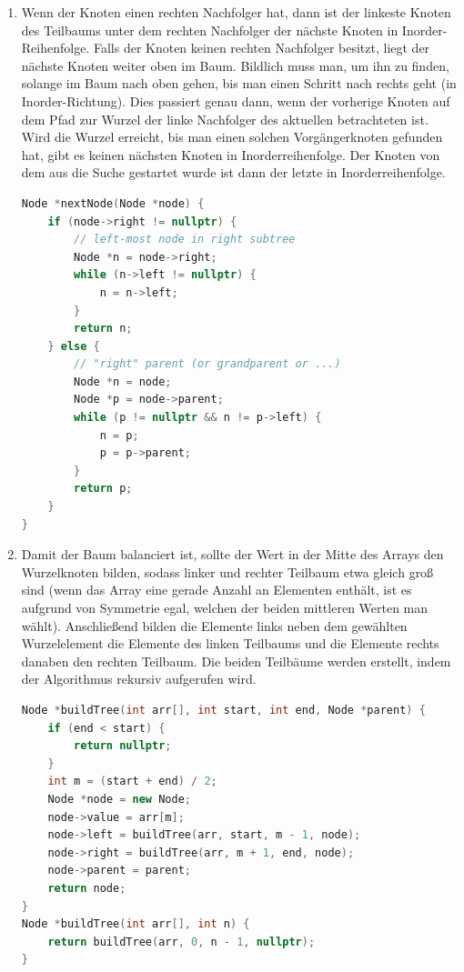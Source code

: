 \documentclass[11pt,a4paper]{article}
\begin{document}
\begin{loesung}
\begin{enumerate}
        \item
        Wenn der Knoten einen rechten Nachfolger hat, dann ist der linkeste Knoten des Teilbaums unter dem rechten Nachfolger der nächste Knoten in Inorder-Reihenfolge.
        Falls der Knoten keinen rechten Nachfolger besitzt, liegt der nächste Knoten weiter oben im Baum.
        Bildlich muss man, um ihn zu finden, solange im Baum nach oben gehen, bis man einen Schritt nach rechts geht (in Inorder-Richtung).
        Dies passiert genau dann, wenn der vorherige Knoten auf dem Pfad zur Wurzel der linke Nachfolger des aktuellen betrachteten ist.
        Wird die Wurzel erreicht, bis man einen solchen Vorgängerknoten gefunden hat, gibt es keinen nächsten Knoten in Inorderreihenfolge.
        Der Knoten von dem aus die Suche gestartet wurde ist dann der letzte in Inorderreihenfolge.
        \begin{lstlisting}[language=c++]
Node *nextNode(Node *node) {
    if (node->right != nullptr) {
        // left-most node in right subtree
        Node *n = node->right;
        while (n->left != nullptr) {
            n = n->left;
        }
        return n;
    } else {
        // "right" parent (or grandparent or ...)
        Node *n = node;
        Node *p = node->parent;
        while (p != nullptr && n != p->left) {
            n = p;
            p = p->parent;
        }
        return p;
    }
}
        \end{lstlisting}

        \item 
        Damit der Baum balanciert ist, sollte der Wert in der Mitte des Arrays den Wurzelknoten bilden, sodass linker und rechter Teilbaum etwa gleich groß sind (wenn das Array eine gerade Anzahl an Elementen enthält, ist es aufgrund von Symmetrie egal, welchen der beiden mittleren Werten man wählt).
        Anschließend bilden die Elemente links neben dem gewählten Wurzelelement die Elemente des linken Teilbaums und die Elemente rechts danaben den rechten Teilbaum.
        Die beiden Teilbäume werden erstellt, indem der Algorithmus rekursiv aufgerufen wird.
        \begin{lstlisting}[language=c++]
Node *buildTree(int arr[], int start, int end, Node *parent) {
    if (end < start) {
        return nullptr;
    }
    int m = (start + end) / 2;
    Node *node = new Node;
    node->value = arr[m];
    node->left = buildTree(arr, start, m - 1, node);
    node->right = buildTree(arr, m + 1, end, node);
    node->parent = parent;
    return node;
}
Node *buildTree(int arr[], int n) {
    return buildTree(arr, 0, n - 1, nullptr);
}
        \end{lstlisting}
    \end{enumerate}
\end{loesung}
\end{document}

